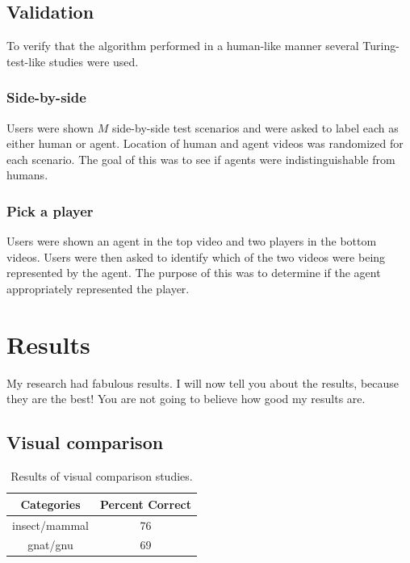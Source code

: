 \documentclass[12pt]{thesis}
\begin{document}
\section{Validation}
To verify that the algorithm performed in a human-like manner several 
Turing-test-like studies were used. 

\subsection{Side-by-side}
Users were shown $M$ side-by-side test scenarios and were asked to label each 
as either human or agent. Location of human and agent videos was randomized for 
each scenario. The goal of this was to see if agents were indistinguishable 
from humans.

\subsection{Pick a player}
Users were shown an agent in the top video and two players in the bottom videos. 
Users were then asked to identify which of the two videos were being 
represented by the agent. The purpose of this was to determine if the agent 
appropriately represented the player.



\chapter{Results}
My research had fabulous results. I will now tell you about
the results, because they are the best!  You are not going
to believe how good my results are.

\section{Visual comparison}

\begin{table}
\caption{Results of visual comparison studies.}
\begin{center}
  \begin{tabular}{|c|c|}
    \hline
    \bf Categories & \bf Percent Correct\\
    \hline
    \hline
    insect/mammal & 76\\
    \hline
    gnat/gnu & 69\\
    \hline
  \end{tabular}
\end{center}
\label{table:comp1}
\end{table}
\end{document}
